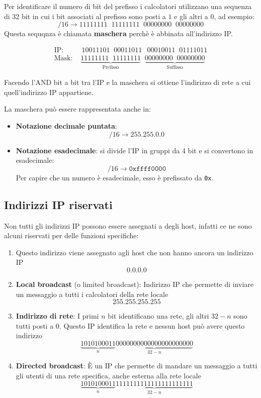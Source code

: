 \documentclass[a4paper]{article}
\begin{document}
\noindent
Per identificare il numero di bit del prefisso i calcolatori utilizzano una sequenza di
32 bit in cui i bit associati al prefisso sono posti a \( 1 \) e gli altri a \( 0 \),
ad esempio:
\[
/16 \to 11111111 \;\; 11111111 \;\; 00000000 \;\; 00000000
\] 
Questa sequqnza è chiamata \textbf{maschera} perchè è abbinata all'indirizzo IP.
\begin{example}
\[
  \begin{aligned}
    \text{IP: } & \,10011101 \;\; 00011011 \;\;\, 00010011 \;\; 01111011\\
    \text{Mask: }& \underbrace{11111111 \;\; 11111111}_{\text{Prefisso}} \;\; \underbrace{00000000 \;\; 00000000}_{\text{Suffisso}}
  \end{aligned}
\] 
\end{example}
Facendo l'AND bit a bit tra l'IP e la maschera si ottiene l'indirizzo di rete a cui
quell'indirizzo IP appartiene.

\vspace{1em}
\noindent
La maschera può essere rappresentata anche in:
\begin{itemize}
  \item \textbf{Notazione decimale puntata}:
    \[
      /16 \to 255.255.0.0
    \] 
  \item \textbf{Notazione esadecimale}: si divide l'IP in gruppi da 4 bit e si convertono
    in esadecimale:
    \[
      /16 \to \texttt{0xffff0000}
    \] 
    Per capire che un numero è esadecimale, esso è prefissato da \texttt{0x}.
\end{itemize}

\subsection{Indirizzi IP riservati}
Non tutti gli indirizzi IP possono essere assegnati a degli host, infatti ce ne sono alcuni
riservati per delle funzioni specifiche:
\begin{enumerate}
  \item Questo indirizzo viene assegnato agli host che non hanno ancora un indirizzo IP
    \[
      0.0.0.0
    \] 
  \item \textbf{Local broadcast} (o limited broadcast): Indirizzo IP che permette di 
    inviare un messaggio a tutti i calcolatori della rete locale
    \[
      255.255.255.255
    \]
  \item \textbf{Indirizzo di rete}: I primi \( n \) bit identificano una rete, gli altri
    \( 32 - n \) sono tutti posti a 0. Questo IP identifica la rete e nessun host può
    avere questo indirizzo
    \[
      \underbrace{1010100011}_{n} \underbrace{0000000000000000000000}_{32-n}
    \] 
  \item \textbf{Directed broadcast}: È un IP che permette di mandare un messaggio a tutti
    gli utenti di una rete specifica, anche esterna alla rete locale
    \[
      \underbrace{1010100011}_{n} \underbrace{1111111111111111111111}_{32-n}
    \] 
\end{enumerate}
\end{document}
